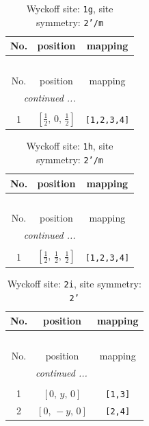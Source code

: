 \documentclass[fleqn,8pt]{jsarticle}
\begin{document}
\renewcommand{\arraystretch}{1.2}
\begin{longtable}{ccc}
\caption{Wyckoff site: {\tt 1g}, site symmetry: {\tt 2'/m}}
 \\
 \hline \hline
No. & position & mapping \\ \hline \endfirsthead

\multicolumn{2}{l}{\tablename\ \thetable{}} \\
 \hline \hline
No. & position & mapping \\ \hline \endhead

 \hline \hline
\multicolumn{2}{r}{\footnotesize\it continued ...} \\ \endfoot

 \hline \hline
\multicolumn{2}{r}{} \\ \endlastfoot

1 & $\left[ \frac{1}{2},\, 0,\, \frac{1}{2} \right]$ & {\tt [1,2,3,4]} \\
\end{longtable}
\renewcommand{\arraystretch}{1.2}
\begin{longtable}{ccc}
\caption{Wyckoff site: {\tt 1h}, site symmetry: {\tt 2'/m}}
 \\
 \hline \hline
No. & position & mapping \\ \hline \endfirsthead

\multicolumn{2}{l}{\tablename\ \thetable{}} \\
 \hline \hline
No. & position & mapping \\ \hline \endhead

 \hline \hline
\multicolumn{2}{r}{\footnotesize\it continued ...} \\ \endfoot

 \hline \hline
\multicolumn{2}{r}{} \\ \endlastfoot

1 & $\left[ \frac{1}{2},\, \frac{1}{2},\, \frac{1}{2} \right]$ & {\tt [1,2,3,4]} \\
\end{longtable}
\renewcommand{\arraystretch}{1.2}
\begin{longtable}{ccc}
\caption{Wyckoff site: {\tt 2i}, site symmetry: {\tt 2'}}
 \\
 \hline \hline
No. & position & mapping \\ \hline \endfirsthead

\multicolumn{2}{l}{\tablename\ \thetable{}} \\
 \hline \hline
No. & position & mapping \\ \hline \endhead

 \hline \hline
\multicolumn{2}{r}{\footnotesize\it continued ...} \\ \endfoot

 \hline \hline
\multicolumn{2}{r}{} \\ \endlastfoot

1 & $\left[ 0,\, y,\, 0 \right]$ & {\tt [1,3]} \\ \hline
2 & $\left[ 0,\, - y,\, 0 \right]$ & {\tt [2,4]} \\
\end{longtable}
\end{document}
